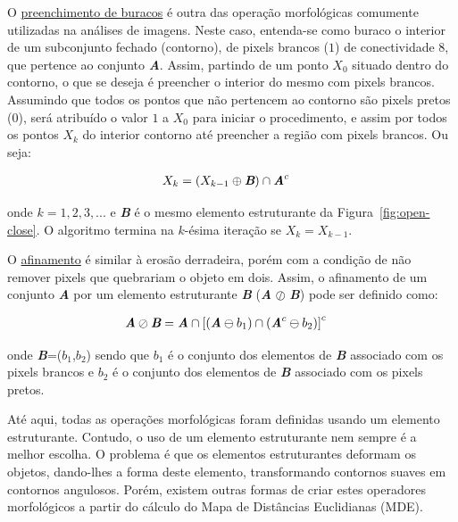O \underline{preenchimento de buracos} é outra das operação
morfológicas comumente utilizadas na análises de imagens. Neste caso,
entenda-se como buraco o interior de um subconjunto fechado
(contorno), de pixels brancos ($1$) de conectividade 8, que pertence
ao conjunto \textit{\textbf{A}}. Assim, partindo de um ponto $X_{0}$
situado dentro do contorno, o que se deseja é preencher o interior do
mesmo com pixels brancos. Assumindo que todos os pontos que não
pertencem ao contorno são pixels pretos ($0$), será atribuído o valor
$1$ a $X_{0}$ para iniciar o procedimento, e assim por todos os pontos
$X_{k}$ do interior contorno até preencher a região com pixels
brancos. Ou seja:

\begin{align}
 &X_{k} = \left(X_{k-1} \oplus \textit{\textbf{B}} \right) \cap \textit{\textbf{A}}^{c}
\end{align}

onde $k=1,2,3, ...$ e \textit{\textbf{B}} é o mesmo elemento
estruturante da Figura~\ref{fig:open-close}. O algoritmo termina na
$k$-ésima iteração se $X_{k}=X_{k-1}$.
 
O \underline{afinamento} é similar à erosão derradeira, porém com a
condição de não remover pixels que quebrariam o objeto em dois. Assim,
o afinamento de um conjunto \textit{\textbf{A}} por um elemento
estruturante \textit{\textbf{B}} (\textit{\textbf{A}} $\oslash$
\textit{\textbf{B}}) pode ser definido como:

\begin{align}
 &\textit{\textbf{A}} \oslash \textit{\textbf{B}} = \textit{\textbf{A}} \cap \left[ \left( \textit{\textbf{A}} \ominus b_{1}\right) \cap \left( \textit{\textbf{A}}^c \ominus b_{2}\right) \right]^{c}
\end{align}

onde \textit{\textbf{B}}=($b_1$,$b_2$) sendo que $b_1$ é o conjunto
dos elementos de \textit{\textbf{B}} associado com os pixels brancos e
$b_2$ é o conjunto dos elementos de \textit{\textbf{B}} associado com
os pixels pretos.

Até aqui, todas as operações morfológicas foram definidas usando um
elemento estruturante. Contudo, o uso de um elemento estruturante nem
sempre é a melhor escolha. O problema é que os elementos estruturantes
deformam os objetos, dando-lhes a forma deste elemento, transformando
contornos suaves em contornos angulosos. Porém, existem outras formas
de criar estes operadores morfológicos a partir do cálculo do Mapa de
Distâncias Euclidianas (MDE).

